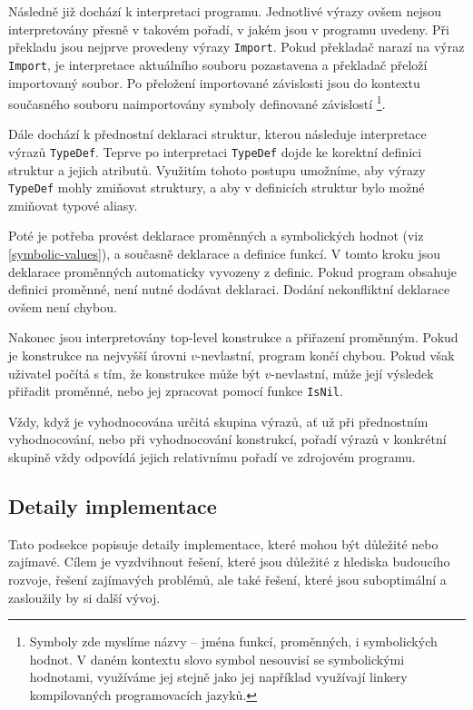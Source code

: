 Následně již dochází k interpretaci programu. Jednotlivé výrazy ovšem nejsou interpretovány přesně
v takovém pořadí, v jakém jsou v programu uvedeny. Při překladu jsou nejprve provedeny výrazy
\lstinline{Import}. Pokud překladač narazí na výraz \lstinline{Import}, je interpretace aktuálního
souboru pozastavena a překladač přeloží importovaný soubor. Po přeložení importované závislosti
jsou do kontextu současného souboru naimportovány symboly definované závislostí \footnote{
  Symboly zde myslíme názvy -- jména funkcí, proměnných, i symbolických hodnot. V daném kontextu
  slovo symbol nesouvisí se symbolickými hodnotami, využíváme jej stejně jako jej například
  využívají linkery kompilovaných programovacích jazyků.
}.

Dále dochází k přednostní deklaraci struktur, kterou následuje interpretace výrazů
\lstinline{TypeDef}. Teprve po interpretaci \lstinline{TypeDef} dojde ke korektní definici struktur
a jejich atributů. Využitím tohoto postupu umožníme, aby výrazy \lstinline{TypeDef} mohly zmiňovat
struktury, a aby v definicích struktur bylo možné zmiňovat typové aliasy.

Poté je potřeba provést deklarace proměnných a symbolických hodnot (viz \ref{symbolic-values}),
a současně deklarace a definice funkcí. V tomto kroku jsou deklarace proměnných automaticky
vyvozeny z definic. Pokud program obsahuje definici proměnné, není nutné dodávat deklaraci. Dodání
nekonfliktní deklarace ovšem není chybou.

Nakonec jsou interpretovány top-level konstrukce a přiřazení proměnným. Pokud je konstrukce
na nejvyšší úrovni $v$-nevlastní, program končí chybou. Pokud však uživatel počítá s tím, že
konstrukce může být $v$-nevlastní, může její výsledek přiřadit proměnné, nebo jej zpracovat
pomocí funkce \lstinline{IsNil}.

Vždy, když je vyhodnocována určitá skupina výrazů, ať už při přednostním vyhodnocování, nebo při
vyhodnocování konstrukcí, pořadí výrazů v konkrétní skupině vždy odpovídá jejich relativnímu pořadí
ve zdrojovém programu.

\subsection{Detaily implementace}

Tato podsekce popisuje detaily implementace, které mohou být důležité nebo zajímavé. Cílem je
vyzdvihnout řešení, které jsou důležité z hlediska budoucího rozvoje, řešení zajímavých problémů,
ale také řešení, které jsou suboptimální a zasloužily by si další vývoj.

